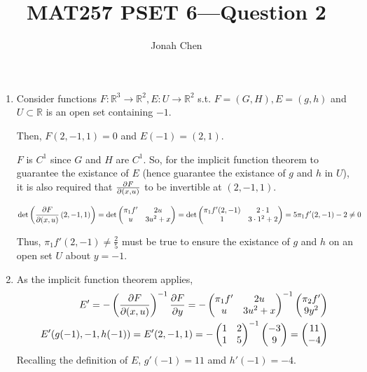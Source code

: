 \documentclass{exam}
\title{MAT257 PSET 6---Question 2}
\author{Jonah Chen}
\numberwithin{equation}{section}
\newcommand{\R}{\mathbb{R}}
\begin{document}
    \sffamily
    \maketitle
    \begin{enumerate}[label=(\alph*)]
        \item Consider functions $F:\R^3\to\R^2, E:U\to\R^2$ s.t. $F=(G,H), E=(g,h)$ and $U\subset\R$ is an open set containing $-1$.
        
        Then, $F(2,-1,1)=0$ and $E(-1)=(2,1)$. 
        
        $F$ is $C^1$ since $G$ and $H$ are $C^1$. So, for the implicit function theorem to guarantee the existance of $E$ (hence guarantee the existance of $g$ and $h$ in $U$), it is also required that $\partialderivative{F}{(x,u)}$ to be invertible at $(2,-1,1)$.

        \begin{align*}
            \det\left(\partialderivative{F}{(x,u)}\left(2,-1,1\right)\right)&=\det\begin{pmatrix}
                \pi_1f'&2u\\u&3u^2+x
            \end{pmatrix}=\det\begin{pmatrix}
                \pi_1f'(2,-1) & 2\cdot1\\1&3\cdot1^2+2
            \end{pmatrix}=5\pi_1f'(2,-1)-2\neq0
        \end{align*}

        Thus, $\pi_1f'(2,-1)\neq\frac{2}{5}$ must be true to ensure the existance of $g$ and $h$ on an open set $U$ about $y=-1$.
        
        \item As the implicit function theorem applies, 
        \begin{align*}
            E'=-\left(\partialderivative{F}{(x,u)}\right)^{-1}\partialderivative{F}{y}=-\begin{pmatrix}
                \pi_1f'&2u\\u&3u^2+x
            \end{pmatrix}^{-1}\begin{pmatrix}
                \pi_2f'\\9y^2
            \end{pmatrix}\\
            E'(g(-1),-1,h(-1))=E'(2,-1,1)=-\begin{pmatrix}
                1&2\\1&5
            \end{pmatrix}^{-1}\begin{pmatrix}
                -3\\9
            \end{pmatrix}=\begin{pmatrix}
                11\\-4
            \end{pmatrix}
        \end{align*}
        Recalling the definition of $E$, $g'(-1)=11$ amd $h'(-1)=-4$.
    \end{enumerate}
\end{document}
